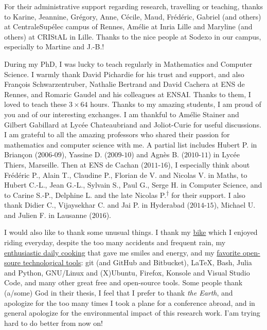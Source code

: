 \begin{acknowledgements}
For their administrative support regarding research, travelling or teaching,
thanks to Karine, Jeannine, Grégory, Anne, Cécile, Maud, Frédéric, Gabriel (and others) at CentraleSupélec campus of Rennes, Amélie at Inria Lille and Maryline (and others) at CRIStAL in Lille.
Thanks to the nice people at Sodexo in our campus, especially to Martine and J.-B.!

During my PhD, I was lucky to teach regularly in Mathematics and Computer Science.
I warmly thank David Pichardie for his trust and support, and also François Schwarzentruber, Nathalie Bertrand and David Cachera at ENS de Rennes, and Romaric Gaudel and his colleagues at ENSAI. Thanks to them, I loved to teach these $3 \times 64$ hours.
Thanks to my amazing students, I am proud of you and of our interesting exchanges.
I am thankful to Amélie Stainer and Gilbert Gabillard at Lycée Chateaubriand and Joliot-Curie for useful discussions.
\\
\indent
I am grateful to all the amazing professors who shared their passion for mathematics and computer science with me.
A partial list includes Hubert P. in Briançon ($2006$-$09$), Yassine D. ($2009$-$10$) and Agnès B. ($2010$-$11$) in Lycée Thiers, Marseille.
Then at ENS de Cachan ($2011$-$16$), I especially think about Frédéric P., Alain T., Claudine P., Florian de V. and Nicolas V. in Maths, to Hubert C.-L., Jean G.-L., Sylvain S., Paul G., Serge H. in Computer Science, and to Carine S.-P., Delphine L. and the late Nicolas P.\textsuperscript{$\dagger$} for their support.
I also thank Didier C., Vijaysekhar C. and Jai P. in Hyderabad ($2014$-$15$), Michael U. and Julien F. in Lausanne ($2016$).


I would also like to thank some unusual things.
I thank my \href{https://perso.crans.org/besson/zero-dechet/}{bike} which I enjoyed riding everyday, despite the too many accidents and frequent rain, my \href{https://perso.crans.org/besson/cuisine/}{enthusiastic daily cooking} that gave me smiles and energy, and my \href{https://perso.crans.org/besson/}{favorite open-soure technological tools}: git (and GitHub and Bitbucket), \LaTeX, Bash, Julia and Python, GNU/Linux and (X)Ubuntu, Firefox, Konsole and Visual Studio Code, and many other great free and open-source tools.
Some people thank (a/some) God in their thesis, I feel that I prefer to thank \emph{the Earth}, and apologize for the too many times I took a plane for a conference abroad, and in general apologize for the environmental impact of this research work. I'am trying hard to do better from now on!



\end{acknowledgements}
